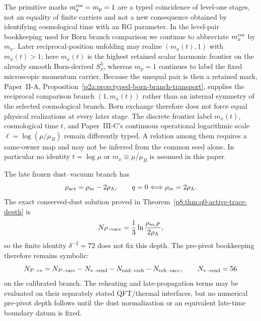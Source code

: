 \documentclass[12pt,a4paper]{article}
\begin{document}
\begin{remark}
\label{p8:rem:born-seed-history-rg-firewall}
The primitive marks $m_x^{\rm res}=m_p=1$ are a typed coincidence of
level-one stages, not an equality of finite carriers and not a new consequence
obtained by identifying cosmological time with an RG parameter.  In the level-pair
bookkeeping used for Born branch comparison we continue to abbreviate
$m_x^{\rm res}$ by $m_x$.  Later reciprocal-position unfolding may realize
$(m_x(t),1)$ with $m_x(t)>1$; here $m_x(t)$ is the highest retained scalar
harmonic frontier on the already smooth Born-derived $S_x^3$, whereas $m_p=1$
continues to label the fixed microscopic momentum carrier.  Because the unequal
pair is then a retained mark, Paper~II-A,
Proposition~\ref{p2a:prop:typed-born-branch-transport}, supplies the reciprocal
comparison branch $(1,m_x(t))$ rather than an internal symmetry of the selected
cosmological branch.  Born exchange therefore does not force equal physical
realizations at every later stage.  The discrete frontier label $m_x(t)$,
cosmological time $t$, and Paper~III-C's continuous operational logarithmic
scale $\ell=\log(\mu/\mu_B)$ remain differently typed.
A relation among them requires a same-owner map and may not be inferred from
the common seed alone.  In particular no identity $t=\log\mu$ or
$m_x\equiv\mu/\mu_B$ is assumed in this paper.
\end{remark}

The late frozen dust--vacuum branch has
\[
\rho_{\rm act}=\rho_m-2\rho_\Lambda,
\qquad
q=0\Longleftrightarrow\rho_m=2\rho_\Lambda .
\]
The exact conserved-dust solution proved in
Theorem~\ref{p8:thm:q0-active-trace-depth} is
\begin{equation}
\label{p8:eq:total-depth-144-intro}
N_{P\to{\rm acc}}
=\frac13\ln\frac{\rho_{m,P}}{2\rho_\Lambda},
\end{equation}
so the finite identity \(\delta^{-2}=72\) does not fix this depth.  The
pre-pivot bookkeeping therefore remains symbolic:
\begin{equation}
\label{p8:eq:pre-pivot-depth}
N_{P\to *}
=N_{P\to{\rm acc}}-N_{*\to{\rm end}}
-N_{{\rm end}\to{\rm reh}}-N_{{\rm reh}\to{\rm acc}},
\qquad N_{*\to{\rm end}}=56
\end{equation}
on the calibrated branch.  The reheating and late-propagation terms may be
evaluated on their separately stated QFT/thermal interfaces, but no numerical
pre-pivot depth follows until the dust normalization or an equivalent late-time
boundary datum is fixed.
\end{document}
